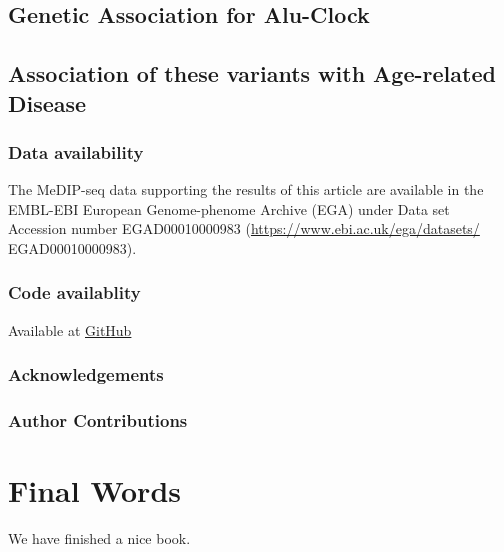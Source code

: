\documentclass[
]{book}
\begin{document}
\hypertarget{genetic-association-for-alu-clock}{%
\section{Genetic Association for Alu-Clock}\label{genetic-association-for-alu-clock}}

\hypertarget{association-of-these-variants-with-age-related-disease}{%
\section{Association of these variants with Age-related Disease}\label{association-of-these-variants-with-age-related-disease}}

\hypertarget{data-availability-1}{%
\subsection{Data availability}\label{data-availability-1}}

The MeDIP-seq data supporting the results of this article are available in the EMBL-EBI European Genome-phenome Archive (EGA) under Data set Accession number EGAD00010000983 (\url{https://www.ebi.ac.uk/ega/datasets/}
EGAD00010000983).

\hypertarget{code-availablity-1}{%
\subsection{Code availablity}\label{code-availablity-1}}

Available at \href{https://github.com/richardjacton}{GitHub}

\newpage

\hypertarget{acknowledgements-2}{%
\subsection{Acknowledgements}\label{acknowledgements-2}}

\hypertarget{author-contributions-1}{%
\subsection{Author Contributions}\label{author-contributions-1}}

\newpage

\hypertarget{final-words}{%
\chapter{Final Words}\label{final-words}}

We have finished a nice book.

  
\end{document}
